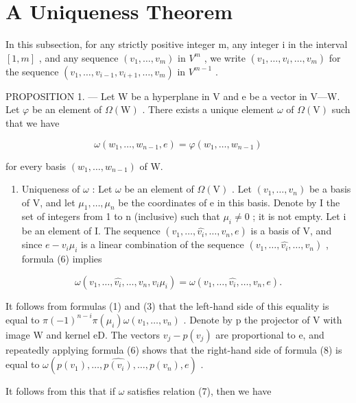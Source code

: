 \section{A Uniqueness Theorem}

In this subsection, for any strictly positive integer m, any integer i in the interval \([1,m]\) , and any sequence \((v_{1},\ldots,v_{m})\) in \(V^{m}\) , we write \((v_{1},\ldots,\widehat{v_{i}},\ldots,v_{m})\) for the sequence \((v_{1},\ldots,v_{i-1},v_{i+1},\ldots,v_{m})\) in \(V^{m-1}\) .

PROPOSITION 1. --- Let W be a hyperplane in V and e be a vector in V---W. Let \(\varphi\) be an element of \(\Omega(\mathrm{W})\) . There exists a unique element \(\omega\) of \(\Omega(\mathrm{V})\) such that we have

\[
\omega (w _ {1}, \ldots , w _ {n - 1}, e) = \varphi (w _ {1}, \ldots , w _ {n - 1})\tag{7}
\]

for every basis \((w_{1},\ldots ,w_{n - 1})\) of W.

\begin{enumerate}
\def\labelenumi{\Alph{enumi})}
\tightlist
\item
  Uniqueness of \(\omega\) : Let \(\omega\) be an element of \(\Omega(\mathrm{V})\) . Let \((v_{1},\ldots,v_{n})\) be a basis of V, and let \(\mu_{1},\ldots,\mu_{n}\) be the coordinates of e in this basis. Denote by I the set of integers from 1 to n (inclusive) such that \(\mu_{i}\neq0\) ; it is not empty. Let i be an element of I. The sequence \((v_{1},\ldots,\widehat{v_{i}},\ldots,v_{n},e)\) is a basis of V, and since \(e-v_{i}\mu_{i}\) is a linear combination of the sequence \((v_{1},\ldots,\widehat{v_{i}},\ldots,v_{n})\) , formula (6) implies
\end{enumerate}

\[
\omega (v _ {1}, \ldots , \widehat {v _ {i}}, \ldots , v _ {n}, v _ {i} \mu_ {i}) = \omega (v _ {1}, \ldots , \widehat {v _ {i}}, \ldots , v _ {n}, e).\tag{8}
\]

It follows from formulas (1) and (3) that the left-hand side of this equality is equal to \(\pi(-1)^{n-i}\pi(\mu_i)\omega(v_1,\ldots,v_n)\) . Denote by p the projector of V with image W and kernel eD. The vectors \(v_j - p(v_j)\) are proportional to e, and repeatedly applying formula (6) shows that the right-hand side of formula (8) is equal to \(\omega(p(v_1),\ldots,\widehat{p(v_i)},\ldots,p(v_n),e)\) .

It follows from this that if \(\omega\) satisfies relation (7), then we have

